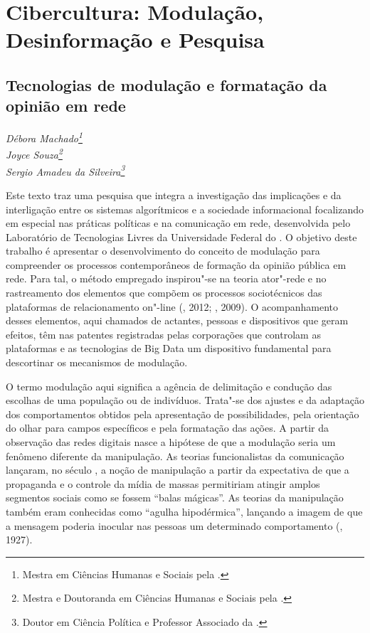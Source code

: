 \part{Cibercultura: Modulação, Desinformação e Pesquisa}

\chapter*{Tecnologias de modulação e formatação da opinião em rede}

\begin{flushright}
\emph{Débora Machado\footnote{Mestra em Ciências Humanas e Sociais pela .}\\Joyce
Souza\footnote{Mestra e Doutoranda em Ciências Humanas e Sociais pela .}\\
Sergio Amadeu da Silveira\footnote{Doutor em Ciência Política e Professor Associado da .}}
\end{flushright}

Este texto traz uma pesquisa que integra a investigação das implicações
e da interligação entre os sistemas algorítmicos e a sociedade
informacional focalizando em especial nas práticas políticas e na
comunicação em rede, desenvolvida pelo Laboratório de Tecnologias Livres
da Universidade Federal do . O objetivo deste trabalho é apresentar o
desenvolvimento do conceito de modulação para compreender os processos
contemporâneos de formação da opinião pública em rede. Para tal, o
método empregado inspirou"-se na teoria ator"-rede e no rastreamento dos
elementos que compõem os processos sociotécnicos das plataformas de
relacionamento on"-line (, 2012; , 2009). O acompanhamento
desses elementos, aqui chamados de actantes, pessoas e dispositivos que
geram efeitos, têm nas patentes registradas pelas corporações que
controlam as plataformas e as tecnologias de Big Data um dispositivo
fundamental para descortinar os mecanismos de modulação.

O termo modulação aqui significa a agência de delimitação e condução das
escolhas de uma população ou de indivíduos. Trata"-se dos ajustes e da
adaptação dos comportamentos obtidos pela apresentação de
possibilidades, pela orientação do olhar para campos específicos e pela
formatação das ações. A partir da observação das redes digitais nasce a
hipótese de que a modulação seria um fenômeno diferente da manipulação.
As teorias funcionalistas da comunicação lançaram, no século , a noção
de manipulação a partir da expectativa de que a propaganda e o controle
da mídia de massas permitiriam atingir amplos segmentos sociais como se
fossem ``balas mágicas''. As teorias da manipulação também eram
conhecidas como ``agulha hipodérmica'', lançando a imagem de que a
mensagem poderia inocular nas pessoas um determinado comportamento
(, 1927).

